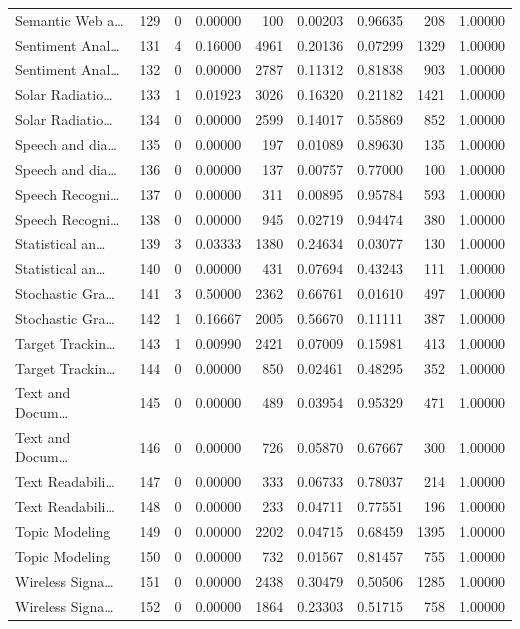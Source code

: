 \begin{table}
\begin{tabular}{lrrrrrrrr}
Semantic Web a… & 129 & 0 & 0.00000 & 100 & 0.00203 & 0.96635 & 208 & 1.00000 \\
Sentiment Anal… & 131 & 4 & 0.16000 & 4961 & 0.20136 & 0.07299 & 1329 & 1.00000 \\
Sentiment Anal… & 132 & 0 & 0.00000 & 2787 & 0.11312 & 0.81838 & 903 & 1.00000 \\
Solar Radiatio… & 133 & 1 & 0.01923 & 3026 & 0.16320 & 0.21182 & 1421 & 1.00000 \\
Solar Radiatio… & 134 & 0 & 0.00000 & 2599 & 0.14017 & 0.55869 & 852 & 1.00000 \\
Speech and dia… & 135 & 0 & 0.00000 & 197 & 0.01089 & 0.89630 & 135 & 1.00000 \\
Speech and dia… & 136 & 0 & 0.00000 & 137 & 0.00757 & 0.77000 & 100 & 1.00000 \\
Speech Recogni… & 137 & 0 & 0.00000 & 311 & 0.00895 & 0.95784 & 593 & 1.00000 \\
Speech Recogni… & 138 & 0 & 0.00000 & 945 & 0.02719 & 0.94474 & 380 & 1.00000 \\
Statistical an… & 139 & 3 & 0.03333 & 1380 & 0.24634 & 0.03077 & 130 & 1.00000 \\
Statistical an… & 140 & 0 & 0.00000 & 431 & 0.07694 & 0.43243 & 111 & 1.00000 \\
Stochastic Gra… & 141 & 3 & 0.50000 & 2362 & 0.66761 & 0.01610 & 497 & 1.00000 \\
Stochastic Gra… & 142 & 1 & 0.16667 & 2005 & 0.56670 & 0.11111 & 387 & 1.00000 \\
Target Trackin… & 143 & 1 & 0.00990 & 2421 & 0.07009 & 0.15981 & 413 & 1.00000 \\
Target Trackin… & 144 & 0 & 0.00000 & 850 & 0.02461 & 0.48295 & 352 & 1.00000 \\
Text and Docum… & 145 & 0 & 0.00000 & 489 & 0.03954 & 0.95329 & 471 & 1.00000 \\
Text and Docum… & 146 & 0 & 0.00000 & 726 & 0.05870 & 0.67667 & 300 & 1.00000 \\
Text Readabili… & 147 & 0 & 0.00000 & 333 & 0.06733 & 0.78037 & 214 & 1.00000 \\
Text Readabili… & 148 & 0 & 0.00000 & 233 & 0.04711 & 0.77551 & 196 & 1.00000 \\
Topic Modeling & 149 & 0 & 0.00000 & 2202 & 0.04715 & 0.68459 & 1395 & 1.00000 \\
Topic Modeling & 150 & 0 & 0.00000 & 732 & 0.01567 & 0.81457 & 755 & 1.00000 \\
Wireless Signa… & 151 & 0 & 0.00000 & 2438 & 0.30479 & 0.50506 & 1285 & 1.00000 \\
Wireless Signa… & 152 & 0 & 0.00000 & 1864 & 0.23303 & 0.51715 & 758 & 1.00000 \\
\bottomrule
\end{tabular}
\end{table}
